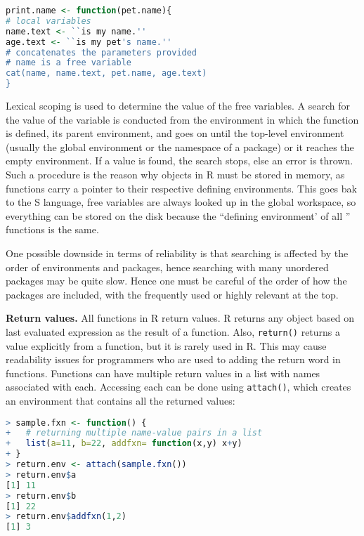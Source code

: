 \documentclass[12pt]{article}
\begin{document}
\begin{lstlisting}[language=R ]
print.name <- function(pet.name){
# local variables
name.text <- ``is my name.''
age.text <- ``is my pet's name.''
# concatenates the parameters provided
# name is a free variable
cat(name, name.text, pet.name, age.text)
}
\end{lstlisting}

Lexical scoping is used to determine the value of the free variables. A search for the value of the variable is conducted from the environment in which the function is defined, its parent environment, and goes on until the top-level environment (usually the global environment or the namespace of a package) or it reaches the empty environment. If a value is found, the search stops, else an error is thrown. Such a procedure is the reason why objects in R must be stored in memory, as functions carry a pointer to their respective defining environments. This goes bak to the S language, free variables are always looked up in the global workspace, so everything can be stored on the disk because the ``defining environment' of all '' functions is the same.

One possible downside in terms of reliability is that searching is affected by the order of environments and packages, hence searching with many unordered packages may be quite slow. Hence one must be careful of the order of how the packages are included, with the frequently used or highly relevant at the top.

\textbf{Return values.} All functions in R return values. R returns any object based on last evaluated expression  as the result of a function. Also, \texttt{return()} returns a value explicitly from a function, but it is rarely used in R. This may cause readability issues for programmers who are used to adding the return word in functions. Functions can have multiple return values in a list with names associated with each. Accessing each can be done using \texttt{attach()}, which creates an environment that contains all the returned values:

\begin{lstlisting}[language=R ]
> sample.fxn <- function() {
+ 	# returning multiple name-value pairs in a list
+	list(a=11, b=22, addfxn= function(x,y) x+y)
+ }
> return.env <- attach(sample.fxn())
> return.env$a
[1] 11
> return.env$b
[1] 22
> return.env$addfxn(1,2)
[1] 3
\end{lstlisting}
\end{document}
